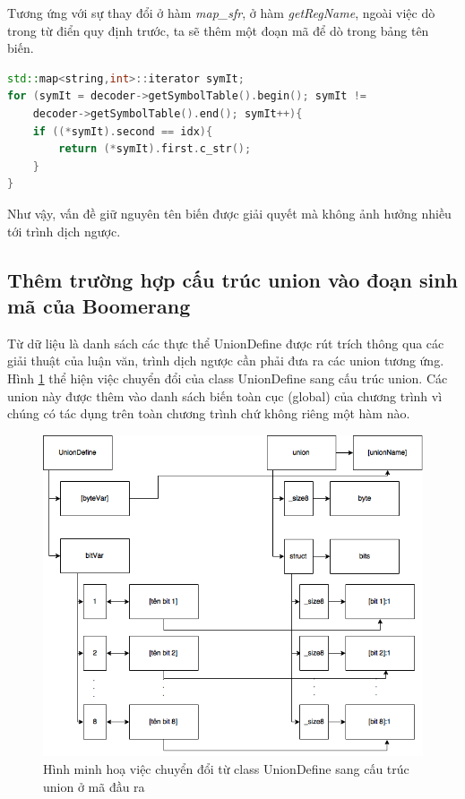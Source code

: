 Tương ứng với sự thay đổi ở hàm \textit{map\_sfr},  ở hàm \textit{getRegName}, ngoài việc dò trong từ điển quy định trước, ta sẽ thêm một đoạn mã để dò trong bảng tên biến. 
\begin{lstlisting}[caption={Phần mã mới được bổ sung trong hàm getRegName},label={list:listgetregnamenew},language=c++]
std::map<string,int>::iterator symIt;
for (symIt = decoder->getSymbolTable().begin(); symIt != 
	decoder->getSymbolTable().end(); symIt++){
	if ((*symIt).second == idx){
		return (*symIt).first.c_str();
	}
}
\end{lstlisting}
Như vậy, vấn đề giữ nguyên tên biến được giải quyết mà không ảnh hưởng nhiều tới trình dịch ngược.

\subsection{Thêm trường hợp cấu trúc union vào đoạn sinh mã của Boomerang}

Từ dữ liệu là danh sách các thực thể UnionDefine được rút trích thông qua các giải thuật của luận văn, trình dịch ngược cần phải đưa ra các union tương ứng. Hình \ref{fig:uniondefinemapping} thể hiện việc chuyển đổi của class UnionDefine sang cấu trúc union. Các union này được thêm vào danh sách biến toàn cục (global) của chương trình vì chúng có tác dụng trên toàn chương trình chứ không riêng một hàm nào.

\begin{figure}[h!]
\centering
\includegraphics[width=0.7\linewidth]{image/unionDefineMapping}
\caption{Hình minh hoạ việc chuyển đổi từ class UnionDefine sang cấu trúc union ở mã đầu ra}
\label{fig:uniondefinemapping}
\end{figure}

